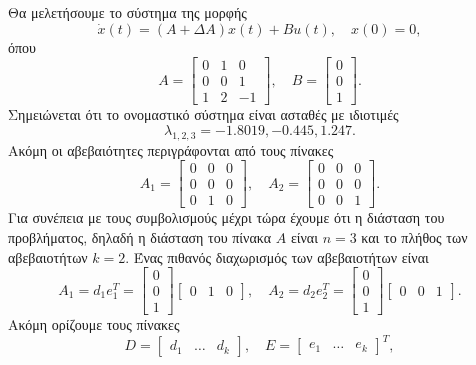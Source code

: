 Θα μελετήσουμε το σύστημα της μορφής
\[
    \dot{x}(t) = (A + \Delta A)x(t) + Bu(t), \quad x(0) = 0,
\]
όπου
\[
    A =
    \begin{bmatrix}
        0 & 1 & 0 \\
        0 & 0 & 1 \\
        1 & 2 & -1
    \end{bmatrix}, \quad
    B =
    \begin{bmatrix}
        0 \\
        0 \\
        1
    \end{bmatrix}.
\]
Σημειώνεται ότι το ονομαστικό σύστημα είναι ασταθές με ιδιοτιμές
\[
    \lambda_{1, 2, 3} = -1.8019, -0.445, 1.247.
\]
Ακόμη οι αβεβαιότητες περιγράφονται από τους πίνακες
\[
    A_1 =
    \begin{bmatrix}
        0 & 0 & 0 \\
        0 & 0 & 0 \\
        0 & 1 & 0
    \end{bmatrix}, \quad
    A_2 =
    \begin{bmatrix}
        0 & 0 & 0 \\
        0 & 0 & 0 \\
        0 & 0 & 1
    \end{bmatrix}.
\]
Για συνέπεια με τους συμβολισμούς μέχρι τώρα έχουμε ότι η διάσταση του
προβλήματος, δηλαδή η διάσταση του πίνακα \( A \) είναι \( n = 3 \) και το
πλήθος των αβεβαιοτήτων \( k = 2 \). Ένας πιθανός διαχωρισμός των αβεβαιοτήτων είναι
\[
    A_1 = d_1e_1^T =
    \begin{bmatrix}
        0 \\
        0 \\
        1
    \end{bmatrix}
    \begin{bmatrix}
        0 & 1 & 0
    \end{bmatrix}, \quad
    A_2 = d_2e_2^T =
    \begin{bmatrix}
        0 \\
        0 \\
        1
    \end{bmatrix}
    \begin{bmatrix}
        0 & 0 & 1
    \end{bmatrix}.
\]
Ακόμη ορίζουμε τους πίνακες
\[
    D = \begin{bmatrix} d_1 & \dots & d_k\end{bmatrix}, \quad
    E = \begin{bmatrix} e_1 & \dots & e_k\end{bmatrix}^T,
\]

